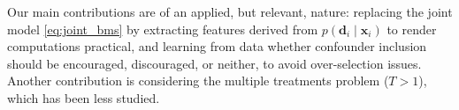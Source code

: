\documentclass[12pt]{article}
\newcommand{\mb}[1]{\mathbf{#1}}
\newcommand{\tr}[1]{#1^{\intercal}}
\newcommand{\bd}{{\mb{d}}}
\newcommand{\bx}{{\mb{x}}}
\newcommand{\bX}{{\mb{X}}}
\newcommand{\bbeta}{{\bm{\beta}}}
\begin{document}
Our main contributions are of an applied, but relevant, nature: replacing the joint model \eqref{eq:joint_bms} by extracting features derived from $p(\bd_i \mid \bx_i)$ to render computations practical, and learning from data whether confounder inclusion should be encouraged, discouraged, or neither, to avoid over-selection issues.
Another contribution is considering the multiple treatments problem ($T>1$), which has been less studied.
\end{document}
